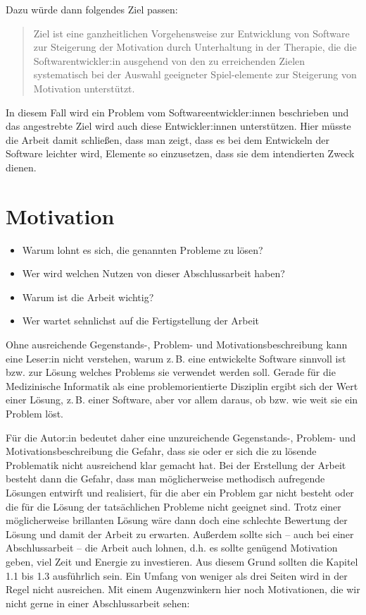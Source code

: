 \documentclass[headsepline,titlepage,twoside,12pt]{report}
\begin{document}
Dazu würde dann folgendes Ziel passen:
\blockquote{Ziel ist eine ganzheitlichen Vorgehensweise zur Entwicklung von Software zur Steigerung der Motivation durch Unterhaltung in der Therapie, die die Softwarentwickler:in ausgehend von den zu erreichenden Zielen systematisch bei der Auswahl geeigneter Spiel-elemente zur Steigerung von Motivation unterstützt.}
In diesem Fall wird ein Problem vom Softwareentwickler:innen beschrieben und das angestrebte Ziel wird auch diese Entwickler:innen unterstützen.
Hier müsste die Arbeit damit schließen, dass man zeigt, dass es bei dem Entwickeln der Software leichter wird, Elemente so einzusetzen, dass sie dem intendierten Zweck dienen.

\section{Motivation}

\begin{itemize}
\item Warum lohnt es sich, die genannten Probleme zu lösen?
\item Wer wird welchen Nutzen von dieser Abschlussarbeit haben?
\item Warum ist die Arbeit wichtig?
\item Wer wartet sehnlichst auf die Fertigstellung der Arbeit
\end{itemize}

Ohne ausreichende Gegenstands-, Problem- und Motivationsbeschreibung kann eine Leser:in nicht verstehen, warum z.\,B. eine entwickelte Software sinnvoll ist bzw. zur Lösung welches Problems sie verwendet werden soll.
Gerade für die Medizinische Informatik als eine problemorientierte Disziplin ergibt sich der Wert einer Lösung, z.\,B. einer Software, aber vor allem daraus, ob bzw. wie weit sie ein Problem löst.

Für die Autor:in bedeutet daher eine unzureichende Gegenstands-, Problem- und Motivationsbeschreibung die Gefahr, dass sie oder er sich die zu lösende Problematik nicht ausreichend klar gemacht hat.
Bei der Erstellung der Arbeit besteht dann die Gefahr, dass man möglicherweise methodisch aufregende Lösungen entwirft und realisiert, für die aber ein Problem gar nicht besteht oder die für die Lösung der tatsächlichen Probleme nicht geeignet sind.
Trotz einer möglicherweise brillanten Lösung wäre dann doch eine schlechte Bewertung der Lösung und damit der Arbeit zu erwarten.
Außerdem sollte sich -- auch bei einer Abschlussarbeit -- die Arbeit auch lohnen, d.h. es sollte genügend Motivation geben, viel Zeit und Energie zu investieren.
Aus diesem Grund sollten die Kapitel 1.1 bis 1.3 ausführlich sein.
Ein Umfang von weniger als drei Seiten wird in der Regel nicht ausreichen.
Mit einem Augenzwinkern hier noch Motivationen, die wir nicht gerne in einer Abschlussarbeit sehen:\\
~~\\
\end{document}
